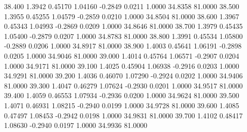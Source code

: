   38.400   1.3942   0.45170   1.04160  -0.2849   0.0211   1.0000  34.8358  81.0000
  38.500   1.3955   0.45255   1.04579  -0.2859   0.0210   1.0000  34.8504  81.0000
  38.600   1.3967   0.45343   1.04993  -0.2869   0.0209   1.0000  34.8646  81.0000
  38.700   1.3979   0.45435   1.05400  -0.2879   0.0207   1.0000  34.8783  81.0000
  38.800   1.3991   0.45534   1.05800  -0.2889   0.0206   1.0000  34.8917  81.0000
  38.900   1.4003   0.45641   1.06191  -0.2898   0.0205   1.0000  34.9046  81.0000
  39.000   1.4014   0.45764   1.06571  -0.2907   0.0204   1.0000  34.9171  81.0000
  39.100   1.4025   0.45904   1.06938  -0.2916   0.0203   1.0000  34.9291  81.0000
  39.200   1.4036   0.46070   1.07290  -0.2924   0.0202   1.0000  34.9406  81.0000
  39.300   1.4047   0.46279   1.07624  -0.2930   0.0201   1.0000  34.9517  81.0000
  39.400   1.4059   0.46553   1.07934  -0.2936   0.0200   1.0000  34.9624  81.0000
  39.500   1.4071   0.46931   1.08215  -0.2940   0.0199   1.0000  34.9728  81.0000
  39.600   1.4085   0.47497   1.08453  -0.2942   0.0198   1.0000  34.9831  81.0000
  39.700   1.4102   0.48417   1.08630  -0.2940   0.0197   1.0000  34.9936  81.0000

